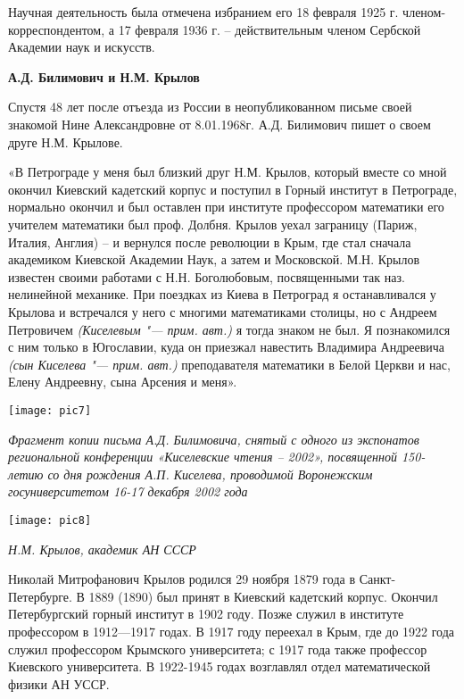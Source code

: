 Научная деятельность была отмечена избранием его 18 февраля 1925 г. членом-корреспондентом, а 17 февраля 1936 г. – действительным членом Сербской Академии наук и искусств.

\begin{center}
{\bf А.Д. Билимович и Н.М. Крылов}
\end{center}

Спустя 48 лет после отъезда из России в неопубликованном письме своей знакомой Нине Александровне от 8.01.1968г. А.Д. Билимович пишет о своем друге Н.М. Крылове.

«В Петрограде у меня был близкий друг Н.М. Крылов, который вместе со мной окончил Киевский кадетский корпус и поступил в Горный институт в Петрограде, нормально окончил и был оставлен при институте профессором математики его учителем математики был проф. Долбня. Крылов уехал заграницу (Париж, Италия, Англия) – и вернулся после революции в Крым, где стал сначала академиком Киевской Академии Наук, а затем и Московской. М.Н. Крылов известен своими работами с Н.Н. Боголюбовым, посвященными так наз. нелинейной механике. При поездках из Киева в Петроград я останавливался у Крылова и встречался у него с многими математиками столицы, но с Андреем Петровичем \textit{(Киселевым "--- прим. авт.)} я тогда знаком не был. Я познакомился с ним только в Югославии, куда он приезжал навестить Владимира Андреевича \textit{(сын Киселева "--- прим. авт.)} преподавателя математики в Белой Церкви и нас, Елену Андреевну, сына Арсения и меня».

\begin{center}
\texttt{[image: pic7]}

{\it Фрагмент копии письма А.Д. Билимовича, снятый с одного из экспонатов региональной конференции «Киселевские чтения – 2002», посвященной 150-летию со дня рождения А.П. Киселева, проводимой Воронежским госуниверситетом 16-17 декабря 2002 года}
\end{center}

\begin{center}
\texttt{[image: pic8]}

{\it Н.М. Крылов, академик АН СССР}
\end{center}

Николай Митрофанович Крылов родился 29 ноября 1879 года в Санкт-Петербурге. В 1889 (1890) был принят в Киевский кадетский корпус. Окончил Петербургский горный институт в 1902 году. Позже служил в институте профессором в 1912—1917 годах. В 1917 году переехал в Крым, где до 1922 года служил профессором Крымского университета; с 1917 года также профессор Киевского университета. В 1922-1945 годах возглавлял отдел математической физики АН УССР.


